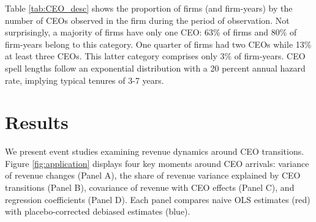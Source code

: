 \documentclass[11pt,a4paper]{article}
\begin{document}
Table \ref{tab:CEO_desc} shows the proportion of firms (and firm-years) by the number of CEOs observed in the firm during the period of observation. Not surprisingly, a majority of firms have only one CEO: 63\% of firms and 80\% of firm-years belong to this category. One quarter of firms had two CEOs while 13\% at least three CEOs. This latter category comprises only 3\% of firm-years. CEO spell lengths follow an exponential distribution with a 20 percent annual hazard rate, implying typical tenures of 3-7 years.


\section{Results}

We present event studies examining revenue dynamics around CEO transitions. Figure \ref{fig:application} displays four key moments around CEO arrivals: variance of revenue changes (Panel A), the share of revenue variance explained by CEO transitions (Panel B), covariance of revenue with CEO effects (Panel C), and regression coefficients (Panel D). Each panel compares naive OLS estimates (red) with placebo-corrected debiased estimates (blue).
\end{document}
